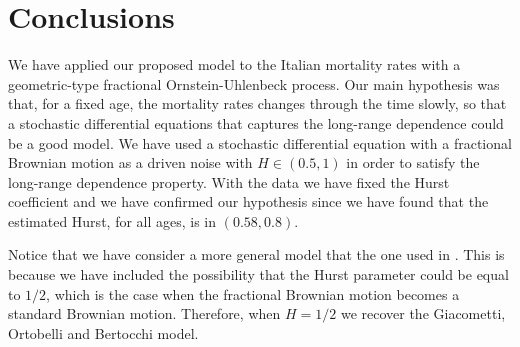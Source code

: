 \documentclass[smallextended]{svjour3}
\begin{document}
%


\section{Conclusions}\label{sec:Conclutions}

        We have applied our proposed model to the Italian mortality rates with a
    geometric-type fractional Ornstein-Uhlenbeck process. Our main hypothesis 
    was that, for a fixed age, the mortality rates changes through the time 
    slowly, so that a stochastic differential equations that captures the 
    long-range dependence  could be a good model. We have used a stochastic 
    differential equation with a fractional Brownian motion as a driven noise 
    with $H \in (\num{0.5}, \num{1})$ in order to satisfy the long-range 
    dependence property. With the data we have fixed the Hurst coefficient and 
    we have confirmed our hypothesis since we have found that the estimated 
    Hurst, for all ages, is in 
    $
        (
            \num{0.58},
            \num{0.8}
        )
    $.  

        Notice that we have consider a more general model that the one used in
    \cite{gi-or-be}. This is because we have included the possibility that the
    Hurst parameter could be equal to $1/2$, which is the case when the 
    fractional Brownian motion becomes a standard Brownian motion. Therefore,
    when $H=1/2$ we recover the  Giacometti, Ortobelli and Bertocchi model.
\end{document}
